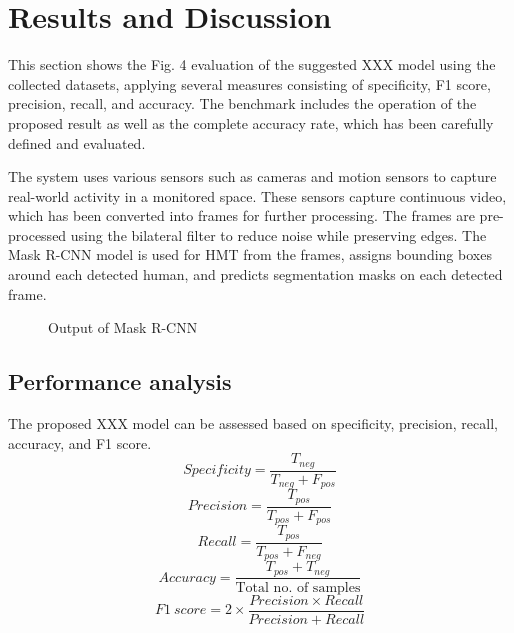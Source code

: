 \documentclass[conference]{IEEEtran}
\begin{document}
\section{Results and Discussion}

This section shows the Fig. 4 evaluation of the suggested XXX model using the collected datasets, applying several measures consisting of specificity, F1 score, precision, recall, and accuracy. The benchmark includes the operation of the proposed result as well as the complete accuracy rate, which has been carefully defined and evaluated.

The system uses various sensors such as cameras and motion sensors to capture real-world activity in a monitored space. These sensors capture continuous video, which has been converted into frames for further processing. The frames are pre-processed using the bilateral filter to reduce noise while preserving edges. The Mask R-CNN model is used for HMT from the frames, assigns bounding boxes around each detected human, and predicts segmentation masks on each detected frame.

\begin{figure}[htbp]
\centering
{}
\caption{Output of Mask R-CNN}
\label{fig4}
\end{figure}

\subsection{Performance analysis}
The proposed XXX model can be assessed based on specificity, precision, recall, accuracy, and F1 score.
\begin{equation}
Specificity = \frac{T_{neg}}{T_{neg}+F_{pos}}
\end{equation}
\begin{equation}
Precision = \frac{T_{pos}}{T_{pos}+F_{pos}}
\end{equation}
\begin{equation}
Recall = \frac{T_{pos}}{T_{pos}+F_{neg}}
\end{equation}
\begin{equation}
Accuracy = \frac{T_{pos}+T_{neg}}{\text{Total no. of samples}}
\end{equation}
\begin{equation}
F1\ score = 2\times\frac{Precision \times Recall}{Precision + Recall}
\end{equation}
\end{document}
